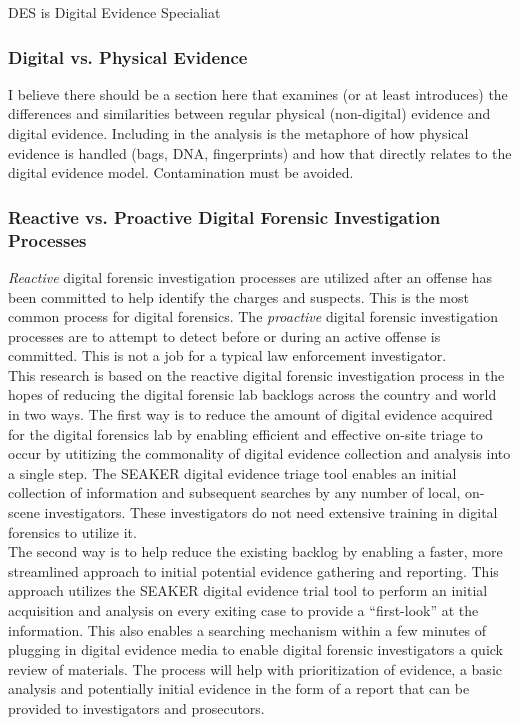 \documentclass[12pt]{article}
\begin{document}
DES is Digital Evidence Specialiat\\

\subsubsection{Digital vs. Physical Evidence}
\vspace{0.5 cm}
I believe there should be a section here that examines (or at least introduces) the differences and similarities
between regular physical (non-digital) evidence and digital evidence.  Including in the analysis is the metaphore of
how physical evidence is handled (bags, DNA, fingerprints) and how that directly relates to the digital evidence
model.  Contamination must be avoided.\\

\subsubsection{Reactive vs. Proactive Digital Forensic Investigation Processes}
\vspace{0.5 cm}
\textit{Reactive} digital forensic investigation processes are utilized after an offense has been committed to help
identify the charges and suspects.  This is the most common process for digital forensics.  The \textit{proactive}
digital forensic investigation processes are to attempt to detect before or during an active offense is committed.
This is not a job for a typical law enforcement investigator.\\

This research is based on the reactive digital forensic investigation process in the hopes of reducing the digital
forensic lab backlogs across the country and world in two ways.  The first way is to reduce the amount of digital
evidence acquired for the digital forensics lab by enabling efficient and effective on-site triage to occur by
utitizing the commonality of digital evidence collection and analysis into a single step.  The SEAKER digital
evidence triage tool enables an initial collection of information and subsequent searches by any number of local,
on-scene investigators.  These investigators do not need extensive training in digital forensics to utilize it.\\

The second way is to help reduce the existing backlog by enabling a faster, more streamlined approach to initial
potential evidence gathering and reporting.  This approach utilizes the SEAKER digital evidence trial tool to 
perform an initial acquisition and analysis on every exiting case to provide a ``first-look'' at the information.  This
also enables a searching mechanism within a few minutes of plugging in digital evidence media to enable digital 
forensic investigators a quick review of materials.  The process will help with prioritization of evidence, a basic
analysis and potentially initial evidence in the form of a report that can be provided to investigators and
prosecutors.\\
\end{document}
